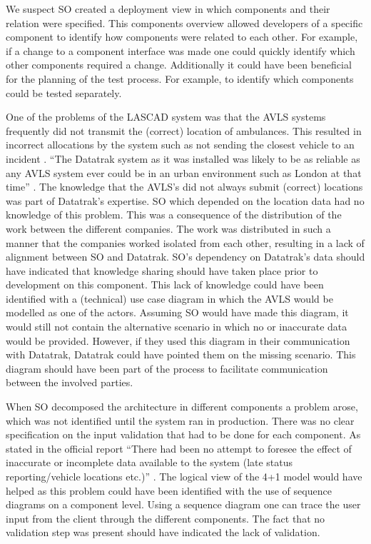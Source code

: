 We suspect SO created a deployment view in which components and their relation were specified.
This components overview allowed developers of a specific component to identify how components were related to each other.
For example, if a change to a component interface was made one could quickly identify which other components required a change.
Additionally it could have been beneficial for the planning of the test process.
For example, to identify which components could be tested separately.

One of the problems of the LASCAD system was that the AVLS systems frequently did not transmit the (correct) location of ambulances.
This resulted in incorrect allocations by the system such as not sending the closest vehicle to an incident \autocite[4022]{officialreport}.
``The Datatrak system as it was installed was likely to be as reliable as any AVLS system ever could be in an urban environment such as London at that time'' \autocite[3133]{officialreport}.
The knowledge that the AVLS’s did not always submit (correct) locations was part of Datatrak’s expertise.
SO which depended on the location data had no knowledge of this problem.
This was a consequence of the distribution of the work between the different companies.
The work was distributed in such a manner that the companies worked isolated from each other, resulting in a lack of alignment between SO and Datatrak.
SO’s dependency on Datatrak’s data should have indicated that knowledge sharing should have taken place prior to development on this component.
This lack of knowledge could have been identified with a (technical) use case diagram in which the AVLS would be modelled as one of the actors.
Assuming SO would have made this diagram, it would still not contain the alternative scenario in which no or inaccurate data would be provided.
However, if they used this diagram in their communication with Datatrak, Datatrak could have pointed them on the missing scenario.
This diagram should have been part of the process to facilitate communication between the involved parties.

When SO decomposed the architecture in different components a problem arose, which was not identified until the system ran in production.
There was no clear specification on the input validation that had to be done for each component.
As stated in the official report ``There had been no attempt to foresee the effect of inaccurate or incomplete data available to the system (late status reporting/vehicle locations etc.)'' \autocite[4001]{officialreport}.
The logical view of the 4+1 model would have helped as this problem could have been identified with the use of sequence diagrams on a component level.
Using a sequence diagram one can trace the user input from the client through the different components.
The fact that no validation step was present should have indicated the lack of validation.